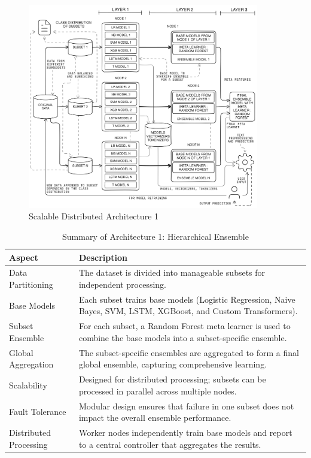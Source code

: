 \begin{figure}[h!]  
    \centering
    \includegraphics[width=0.9\textwidth]{Images/Distributed.png}  
    \caption{Scalable Distributed Architecture 1}
    \label{lstm archi}  %
\end{figure}

\begin{table}[H]
    \caption*{Summary of Architecture 1: Hierarchical Ensemble}
    \label{tab:arch1}
    \begin{tabularx}{\textwidth}{|p{3cm}|X|}
    \hline
    \textbf{Aspect} & \textbf{Description} \\ \hline
    Data Partitioning & The dataset is divided into manageable subsets for independent processing. \\ \hline
    Base Models & Each subset trains base models (Logistic Regression, Naive Bayes, SVM, LSTM, XGBoost, and Custom Transformers). \\ \hline
    Subset Ensemble & For each subset, a Random Forest meta learner is used to combine the base models into a subset-specific ensemble. \\ \hline
    Global Aggregation & The subset-specific ensembles are aggregated to form a final global ensemble, capturing comprehensive learning. \\ \hline
    Scalability & Designed for distributed processing; subsets can be processed in parallel across multiple nodes. \\ \hline
    Fault Tolerance & Modular design ensures that failure in one subset does not impact the overall ensemble performance. \\ \hline
    Distributed Processing & Worker nodes independently train base models and report to a central controller that aggregates the results. \\ \hline
    \end{tabularx}
\end{table}
    
